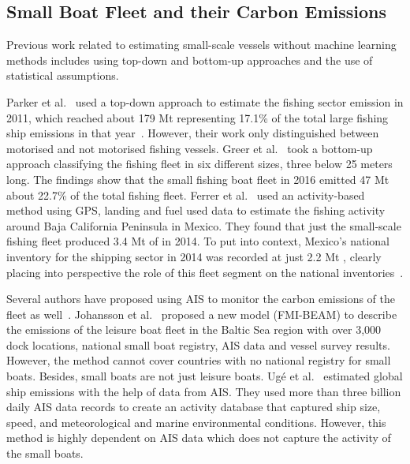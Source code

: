 
\subsection{Small Boat Fleet and their Carbon Emissions}
Previous work related to estimating small-scale vessels without machine learning methods includes using top-down and bottom-up approaches and the use of statistical assumptions. 

Parker et al.~\cite{parker2018fuel} used a top-down approach to estimate the fishing sector emission in 2011, which reached about 179 Mt  representing 17.1\% of the total large fishing ship emissions in that year~\cite{smith2015third}. However, their work only distinguished between motorised and not motorised fishing vessels. Greer et al.~\cite{GREER2019103382} took a bottom-up approach classifying the fishing fleet in six different sizes, three below 25 meters long. The findings show that the small fishing boat fleet in 2016 emitted 47 Mt  about 22.7\% of the total fishing fleet. Ferrer et al.~\cite{ferrer2021mexican} used an activity-based method using GPS, landing and fuel used data to estimate the fishing activity around Baja California Peninsula in Mexico. They found that just the small-scale fishing fleet produced 3.4 Mt of  in 2014. To put into context, Mexico’s national inventory for the shipping sector in 2014 was recorded at just 2.2 Mt , clearly placing into perspective the role of this fleet segment on the national inventories~\cite{inecc2020inventario}.

Several authors have proposed using AIS to monitor the carbon emissions of the fleet as well~\cite{Traut2013MonitoringSE, Johansson2016ACM, Mabunda2014EstimatingCD, Hensel2020GreenSU, Han2016RealtimeIA}. Johansson et al.~\cite{Johansson2018ModelingOL} proposed a new model (FMI-BEAM) to describe the emissions of the leisure boat fleet in the Baltic Sea region with over 3,000 dock locations, national small boat registry, AIS data and vessel survey results. However, the method cannot cover countries with no national registry for small boats. Besides, small boats are not just leisure boats. Ug{\'e} et al.~\cite{Ug2020EstimationOW} estimated global ship emissions with the help of data from AIS. They used more than three billion daily AIS data records to create an activity database that captured ship size, speed, and meteorological and marine environmental conditions. However, this method is highly dependent on AIS data which does not capture the activity of the small boats.

